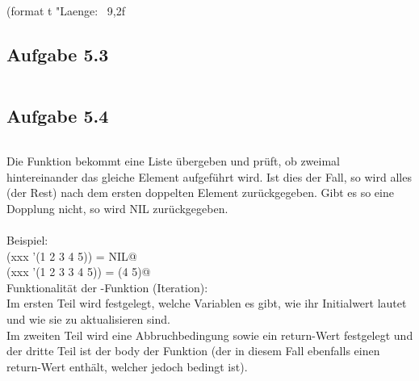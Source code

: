 \documentclass[a4paper, 12pt]{article}
\begin{document}
(format t "Laenge: ~9,2f~%

\subsection*{Aufgabe 5.3}
\inputminted{common-lisp}{durchschnitt.lisp}

\newpage

\subsection*{Aufgabe 5.4}
\inputminted[linenos]{common-lisp}{aufg_4.lisp}

Die Funktion \texttt@xxx@ bekommt eine Liste übergeben
und prüft, ob zweimal hintereinander das gleiche Element aufgeführt wird.
Ist dies der Fall,
so wird alles (der Rest) nach dem ersten doppelten Element zurückgegeben.
Gibt es so eine Dopplung nicht, so wird NIL zurückgegeben.\\
\\
Beispiel:\\ 
\texttt@(xxx '(1 2 3 4 5)) = NIL@ \\
\texttt@(xxx '(1 2 3 3 4 5)) = (4 5)@
\bigskip \\
Funktionalität der \texttt@do@-Funktion (Iteration):\\
Im ersten Teil wird festgelegt, welche Variablen es gibt, wie ihr Initialwert
lautet und wie sie zu aktualisieren sind.\\
Im zweiten Teil wird eine Abbruchbedingung sowie ein return-Wert festgelegt
und der dritte Teil ist der body der Funktion (der in diesem Fall ebenfalls
einen return-Wert enthält, welcher jedoch bedingt ist).
\end{document}
